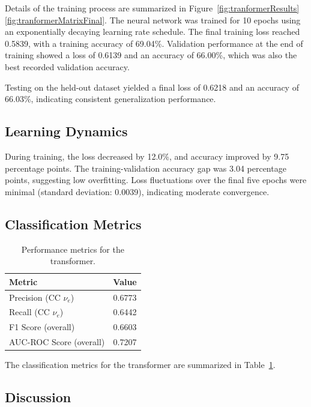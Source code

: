 \documentclass{pracalicmgr}
\begin{document}
Details of the training process are summarized in Figure~\ref{fig:tranformerResults}\ref{fig:tranformerMatrixFinal}. The neural network was trained for 10 epochs using an exponentially decaying learning rate schedule. The final training loss reached 0.5839, with a training accuracy of 69.04\%. Validation performance at the end of training showed a loss of 0.6139 and an accuracy of 66.00\%, which was also the best recorded validation accuracy.

Testing on the held-out dataset yielded a final loss of 0.6218 and an accuracy of 66.03\%, indicating consistent generalization performance.

\subsection{Learning Dynamics}

During training, the loss decreased by 12.0\%, and accuracy improved by 9.75 percentage points. The training-validation accuracy gap was 3.04 percentage points, suggesting low overfitting. Loss fluctuations over the final five epochs were minimal (standard deviation: 0.0039), indicating moderate convergence.

\subsection{Classification Metrics}

\begin{table}[H]
    \centering
    \caption{Performance metrics for the transformer.}
    \begin{tabular}{lc}
        \toprule
        \textbf{Metric} & \textbf{Value} \\
        \midrule
        Precision (CC $\nu_e$) & 0.6773 \\
        Recall (CC $\nu_e$)    & 0.6442 \\
        F1 Score (overall) & 0.6603 \\
        AUC-ROC Score (overall) & 0.7207 \\
        \bottomrule
    \end{tabular}
    \label{tab:cc_metrics}
\end{table}

The classification metrics for the transformer are summarized in Table~\ref{tab:cc_metrics}.

\subsection{Discussion}
\end{document}
